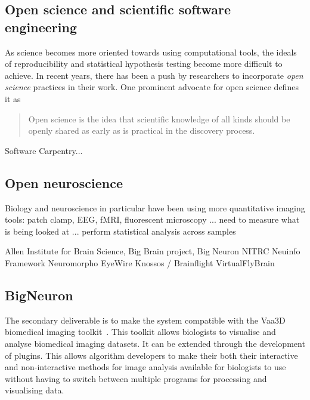 \subsection{Open science and scientific software engineering}\label{subsec:open-science}

As science becomes more oriented towards using computational
tools, the ideals of reproducibility and statistical hypothesis
testing become more difficult to achieve. In recent years, there
has been a push by researchers to incorporate \emph{open science}
practices in their work. One prominent advocate for open science
defines it as
\begin{quote}
	\begin{fancyquote}
	Open science is the idea that scientific knowledge of all kinds
	should be openly shared as early as is practical in the discovery
	process.
	\end{fancyquote}
\end{quote}

%



Software Carpentry...


\subsection{Open neuroscience}
Biology and neuroscience in particular have been using more
quantitative imaging tools: patch clamp, EEG, fMRI, fluorescent
microscopy ... need to measure what is being looked at ... perform
statistical analysis across samples

Allen Institute for Brain Science,
Big Brain project,
Big Neuron
NITRC
Neuinfo  Framework
Neuromorpho
EyeWire
Knossos / Brainflight
VirtualFlyBrain
~\citep{NeuroDebian:Halchenko:2012}

\subsection{BigNeuron}\label{subsec:bigneuron}

{ %
	The secondary deliverable is to make the system compatible
	with the Vaa3D biomedical imaging toolkit~\citep{Vaa3D:site:2015,Vaa3D:Peng:2010,Vaa3D:Peng:2014}.
	This toolkit allows biologists to visualise and analyse
	biomedical imaging datasets. It can be extended through
	the development of plugins. This allows algorithm
	developers to make their both their interactive and
	non-interactive methods for image analysis available
	for biologists to use without having to switch between
	multiple programs for processing and visualising data.
}

